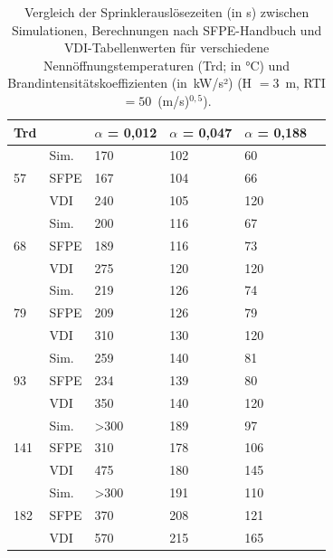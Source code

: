 \begin{table}\centering
\caption{Vergleich der Sprinklerauslösezeiten (in s) zwischen Simulationen, Berechnungen nach SFPE-Handbuch und VDI-Tabellenwerten für verschiedene Nennöffnungstemperaturen (Trd; in °C)  und Brand\-in\-ten\-si\-täts\-ko\-ef\-fi\-zien\-ten (in~kW/s²) (H $=3$~m, RTI $=50$~(m/s)$^{0,5}$).}
\label{tab:AlphasErgebnisse}
\begin{tabu} to 0.7 \toprule
Trd &            & $\alpha$ = 0,012 & $\alpha$ = 0,047 & $\alpha$ = 0,188 \\
    \midrule
   & Sim. & 170              & 102              & 60               \\
57  & SFPE       & 167              & 104              & 66               \\
    & VDI        & 240              & 105              & 120              \\
        \midrule
    & Sim. & 200              & 116              & 67               \\
68  & SFPE       & 189              & 116              & 73               \\
    & VDI        & 275              & 120              & 120              \\
        \midrule
    & Sim. & 219              & 126              & 74               \\
79  & SFPE       & 209              & 126              & 79               \\
    & VDI        & 310              & 130              & 120              \\
        \midrule
    & Sim. & 259              & 140              & 81               \\
93  & SFPE       & 234              & 139              & 80               \\
    & VDI        & 350              & 140              & 120              \\
        \midrule
    & Sim. & \textgreater 300 & 189              & 97               \\
141 & SFPE       & 310              & 178              & 106              \\
    & VDI        & 475              & 180              & 145              \\
        \midrule
    & Sim. & \textgreater 300 & 191              & 110              \\
182 & SFPE       & 370              & 208              & 121              \\
    & VDI        & 570              & 215              & 165             \\
        \bottomrule
\end{tabu}
\end{table}


